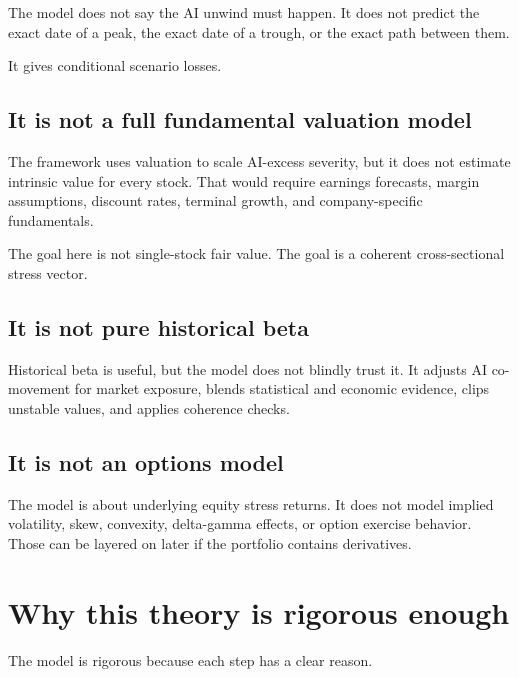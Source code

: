 \documentclass[10pt]{article}
\begin{document}
The model does not say the AI unwind must happen. It does not predict the exact date of a peak, the exact date of a trough, or the exact path between them.

It gives conditional scenario losses.

\subsection{It is not a full fundamental valuation model}

The framework uses valuation to scale AI-excess severity, but it does not estimate intrinsic value for every stock. That would require earnings forecasts, margin assumptions, discount rates, terminal growth, and company-specific fundamentals.

The goal here is not single-stock fair value. The goal is a coherent cross-sectional stress vector.

\subsection{It is not pure historical beta}

Historical beta is useful, but the model does not blindly trust it. It adjusts AI co-movement for market exposure, blends statistical and economic evidence, clips unstable values, and applies coherence checks.

\subsection{It is not an options model}

The model is about underlying equity stress returns. It does not model implied volatility, skew, convexity, delta-gamma effects, or option exercise behavior. Those can be layered on later if the portfolio contains derivatives.

\section{Why this theory is rigorous enough}

The model is rigorous because each step has a clear reason.
\end{document}
